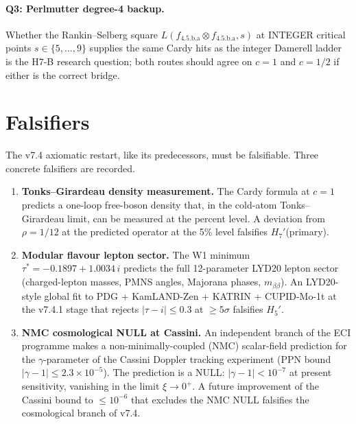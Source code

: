 \documentclass[a4paper,11pt]{article}
\newcommand{\fLM}{f_{\text{4.5.b.a}}}
\theoremstyle{definition}
\theoremstyle{remark}
\begin{document}
\paragraph{Q3: Perlmutter degree-4 backup.}
Whether the Rankin--Selberg square $L(\fLM\otimes\fLM,s)$ at
INTEGER critical points $s\in\{5,\ldots,9\}$ supplies the same Cardy
hits as the integer Damerell ladder is the H7-B research question;
both routes should agree on $c=1$ and $c=1/2$ if either is the
correct bridge.

\section{Falsifiers}
\label{sec:falsifiers}

The v7.4 axiomatic restart, like its predecessors, must be
falsifiable.  Three concrete falsifiers are recorded.

\begin{enumerate}
  \item \textbf{Tonks--Girardeau density measurement.}  The Cardy
    formula at $c=1$ predicts a one-loop free-boson density that, in
    the cold-atom Tonks--Girardeau limit, can be measured at the
    percent level.  A deviation from $\rho=1/12$ at the predicted
    operator at the 5\% level falsifies $H_7'$(primary).
  \item \textbf{Modular flavour lepton sector.}  The W1 minimum
    $\tau^{*}=-0.1897+1.0034\,i$ predicts the full 12-parameter
    LYD20 lepton sector (charged-lepton masses, PMNS angles, Majorana
    phases, $m_{\beta\beta}$).  An LYD20-style global fit to PDG
    + KamLAND-Zen + KATRIN + CUPID-Mo-1t at the v7.4.1 stage that
    rejects $|\tau-i|\le 0.3$ at $\ge 5\sigma$ falsifies $H_5'$.
  \item \textbf{NMC cosmological NULL at Cassini.}  An independent
    branch of the ECI programme makes a non-minimally-coupled (NMC)
    scalar-field prediction for the $\gamma$-parameter of the Cassini
    Doppler tracking experiment (PPN bound $|\gamma-1|\le
    2.3\times 10^{-5}$).  The prediction is a NULL: $|\gamma-1|<
    10^{-7}$ at present sensitivity, vanishing in the limit
    $\xi\to 0^{+}$.  A future improvement of the Cassini
    bound to $\le 10^{-6}$ that excludes the NMC NULL falsifies
    the cosmological branch of v7.4.
\end{enumerate}

\end{document}
